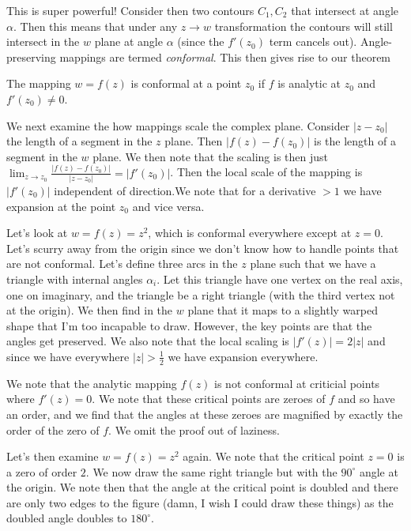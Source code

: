 \documentclass[10pt]{report}
\newcommand{\abs}[1]{\left|#1\right|}
\begin{document}
This is super powerful! Consider then two contours $C_1, C_2$ that intersect at angle $\alpha$. Then this means that under any $z \to w$ transformation the contours will still intersect in the $w$ plane at angle $\alpha$ (since the $f'(z_0)$ term cancels out). Angle-preserving mappings are termed \emph{conformal}. This then gives rise to our theorem
\begin{center}
    The mapping $w=f(z)$ is conformal at a point $z_0$ if $f$ is analytic at $z_0$ and $f'(z_0) \neq 0$.
\end{center}

We next examine the how mappings scale the complex plane. Consider $\abs{z-z_0}$ the length of a segment in the $z$ plane. Then $\abs{f(z) - f(z_0)}$ is the length of a segment in the $w$ plane. We then note that the scaling is then just $\lim_{z \to z_0}\frac{\abs{f(z) - f(z_0)}}{\abs{z-z_0}} = \abs{f'(z_0)}$. Then the local scale of the mapping is $\abs{f'(z_0)}$ independent of direction.We note that for a derivative $> 1$ we have expansion at the point $z_0$ and vice versa.

Let's look at $w = f(z) = z^2$, which is conformal everywhere except at $z=0$. Let's scurry away from the origin since we don't know how to handle points that are not conformal. Let's define three arcs in the $z$ plane such that we have a triangle with internal angles $\alpha_i$. Let this triangle have one vertex on the real axis, one on imaginary, and the triangle be a right triangle (with the third vertex not at the origin). We then find in the $w$ plane that it maps to a slightly warped shape that I'm too incapable to draw. However, the key points are that the angles get preserved. We also note that the local scaling is $\abs{f'(z)} = 2\abs{z}$ and since we have everywhere $\abs{z} > \frac{1}{2}$ we have expansion everywhere.

We note that the analytic mapping $f(z)$ is not conformal at criticial points where $f'(z) = 0$. We note that these critical points are zeroes of $f$ and so have an order, and we find that the angles at these zeroes are magnified by exactly the order of the zero of $f$. We omit the proof out of laziness.

Let's then examine $w=f(z) = z^2$ again. We note that the critical point $z=0$ is a zero of order $2$. We now draw the same right triangle but with the $90^\circ$ angle at the origin. We note then that the angle at the critical point is doubled and there are only two edges to the figure (damn, I wish I could draw these things) as the doubled angle doubles to $180^\circ$.
\end{document}
